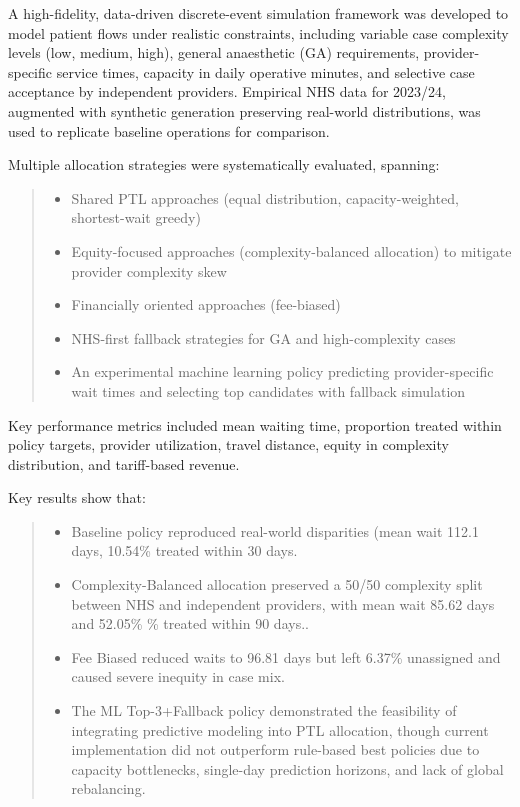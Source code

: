 \documentclass[ %
                    author={Nattanan Nawakitbamrung},
                supervisor={Dr. Sébastien Rochat},
                    degree={MSc},
                     title={Developing and Evaluating the Impact of a Single Patient Treatment List (PTL) for an NHS Integrated Care System},
                  subtitle={},
                      type={},
                      year={2025}]{dissertation}
\begin{document}
\vspace{0.2cm}
A high-fidelity, data-driven discrete-event simulation framework was developed to model patient flows under realistic constraints, including variable case complexity levels (low, medium, high), general anaesthetic (GA) requirements, provider-specific service times, capacity in daily operative minutes, and selective case acceptance by independent providers. Empirical NHS data for 2023/24, augmented with synthetic generation preserving real-world distributions, was used to replicate baseline operations for comparison.

\vspace{0.5cm}
\noindent
Multiple allocation strategies were systematically evaluated, spanning:
\begin{quote}
    \begin{itemize}
        \item Shared PTL approaches (equal distribution, capacity-weighted, shortest-wait greedy)
        \item Equity-focused approaches (complexity-balanced allocation) to mitigate provider complexity skew
        \item Financially oriented approaches (fee-biased)
        \item NHS-first fallback strategies for GA and high-complexity cases
        \item An experimental machine learning policy predicting provider-specific wait times and selecting top candidates with fallback simulation
    \end{itemize}
\end{quote}

Key performance metrics included mean waiting time, proportion treated within policy targets, provider utilization, travel distance, equity in complexity distribution, and tariff-based revenue.

\noindent
Key results show that:
\begin{quote}
    \begin{itemize}
        \item Baseline policy reproduced real-world disparities (mean wait 112.1 days, 10.54\% treated within 30 days.
        \item Complexity-Balanced allocation preserved a 50/50 complexity split between NHS and independent providers, with mean wait 85.62 days and 52.05\% \% treated within 90 days..
        \item Fee Biased reduced waits to 96.81 days but left 6.37\% unassigned and caused severe inequity in case mix.
        \item The ML Top-3+Fallback policy demonstrated the feasibility of integrating predictive modeling into PTL allocation, though current implementation did not outperform rule-based best policies due to capacity bottlenecks, single-day prediction horizons, and lack of global rebalancing.
    \end{itemize}
\end{quote}
\end{document}
